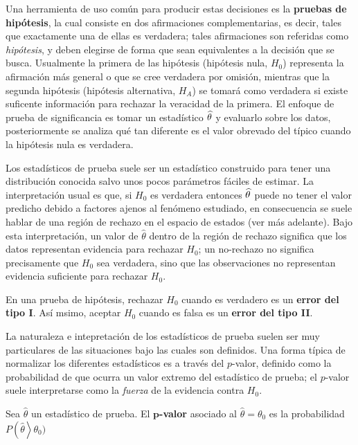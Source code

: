 Una herramienta de uso común para producir estas decisiones es la \textbf{pruebas de hipótesis},
la cual consiste en dos afirmaciones complementarias, es decir, tales que exactamente una de ellas es verdadera; tales afirmaciones
son referidas como \textit{hipótesis}, y deben elegirse de forma que sean equivalentes a la 
decisión que se busca. 
%
Usualmente la primera de las hipótesis (hipótesis nula, $H_0$) representa la afirmación más general o que se cree verdadera por omisión, mientras que la segunda hipótesis (hipótesis alternativa, $H_A$) se tomará como verdadera si
existe suficente información para rechazar la veracidad de la primera.
%
%
El enfoque de prueba de significancia es  tomar un estadístico $\widehat{ \theta }$ y evaluarlo sobre los datos, posteriormente se analiza qué tan diferente es el valor obrevado del típico cuando la hipótesis nula es verdadera.

Los estadísticos de prueba suele ser un estadístico construido para tener una distribución conocida salvo unos pocos parámetros fáciles de estimar.
%
La interpretación usual es que, si $H_0$ es verdadera entonces $\widehat{ \theta }$ puede no tener el valor predicho debido a factores ajenos al fenómeno estudiado, en consecuencia se suele hablar de una región de rechazo en el espacio de estados (ver más adelante).
%
Bajo esta interpretación, un valor de $\widehat{\theta}$ dentro de la región de rechazo significa que los datos representan evidencia para rechazar $H_0$; un no-rechazo no significa precisamente que $H_0$ sea verdadera, sino que las observaciones no representan evidencia suficiente para rechazar $H_0$.

\begin{definicion}
En una prueba de hipótesis, rechazar $H_0$ cuando es verdadero es un \textbf{error del tipo I}. Así msimo, aceptar $H_0$ cuando es falsa es un \textbf{error del tipo II}.
\end{definicion}

La naturaleza e intepretación de los estadísticos de prueba suelen ser muy particulares de las situaciones bajo las cuales son definidos.
%
Una forma típica de normalizar los diferentes estadísticos es a través del $p$-valor, definido como la probabilidad de que ocurra un valor extremo del estadístico de prueba; 
el $p$-valor suele interpretarse como la \textit{fuerza} de la evidencia contra $H_0$.

\begin{definicion}
Sea $\widehat{\theta}$ un estadístico de prueba. El \textbf{$\boldsymbol{p}$-valor} asociado al $\widehat{\theta}=\theta_0$ es la probabilidad $P\left(\widehat{\theta}\right>\theta_0)$
\end{definicion}


